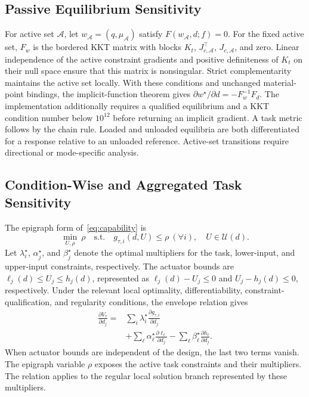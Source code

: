 \subsection{Passive Equilibrium Sensitivity}
For active set $\mathcal A$, let $w_{\mathcal A}=(q,\mu_{\mathcal A})$ satisfy $F(w_{\mathcal A},d;f)=0$. For the fixed active set, $F_w$ is the bordered KKT matrix with blocks $K_t$, $J_{c,\mathcal A}^{\top}$, $J_{c,\mathcal A}$, and zero. Linear independence of the active constraint gradients and positive definiteness of $K_t$ on their null space ensure that this matrix is nonsingular. Strict complementarity maintains the active set locally. With these conditions and unchanged material-point bindings, the implicit-function theorem gives $\partial w^\star/\partial d=-F_w^{-1}F_d$. The implementation additionally requires a qualified equilibrium and a KKT condition number below $10^{12}$ before returning an implicit gradient. A task metric follows by the chain rule. Loaded and unloaded equilibria are both differentiated for a response relative to an unloaded reference. Active-set transitions require directional or mode-specific analysis.

\subsection{Condition-Wise and Aggregated Task Sensitivity}
The epigraph form of~\eqref{eq:capability} is
\begin{equation}
\min_{U,\rho}\ \rho\quad\text{s.t.}\quad g_{\tau,i}(d,U)\leq\rho\ (\forall i),\quad U\in\mathcal U(d).
\label{eq:epigraph}
\end{equation}
Let $\lambda_i^\star$, $\alpha_j^\star$, and $\beta_j^\star$ denote the optimal multipliers for the task, lower-input, and upper-input constraints, respectively. The actuator bounds are $\ell_j(d)\leq U_j\leq h_j(d)$, represented as $\ell_j(d)-U_j\leq0$ and $U_j-h_j(d)\leq0$, respectively. Under the relevant local optimality, differentiability, constraint-qualification, and regularity conditions, the envelope relation gives
\begin{equation}
\begin{aligned}
\frac{\partial V_\tau}{\partial d_j}
={}&\sum_i\lambda_i^\star
\frac{\partial g_{\tau,i}}{\partial d_j}\\
&+\sum_\ell\alpha_\ell^\star
\frac{\partial \ell_\ell}{\partial d_j}
-\sum_\ell\beta_\ell^\star
\frac{\partial h_\ell}{\partial d_j}.
\end{aligned}
\label{eq:envelope-general}
\end{equation}
When actuator bounds are independent of the design, the last two terms vanish. The epigraph variable $\rho$ exposes the active task constraints and their multipliers. The relation applies to the regular local solution branch represented by these multipliers.

